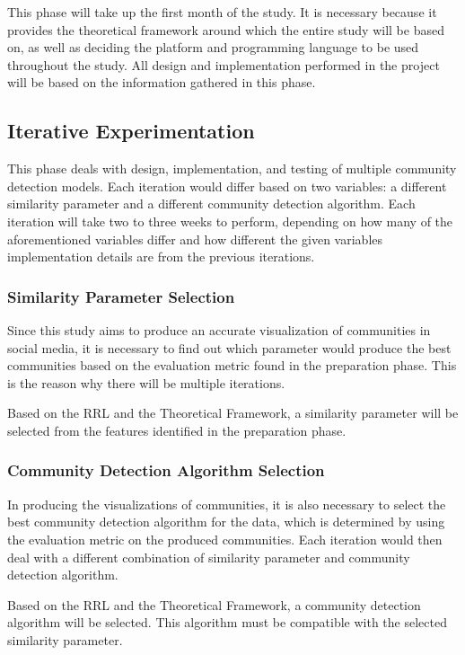 This phase will take up the first month of the study. It is necessary because it provides the theoretical framework around which the entire study will be based on, as well as deciding the platform and programming language to be used throughout the study. All design and implementation performed in the project will be based on the information gathered in this phase.

\subsection{Iterative Experimentation}

This phase deals with design, implementation, and testing of multiple community detection models. Each iteration would differ based on two variables: a different similarity parameter and a different community detection algorithm. Each iteration will take two to three weeks to perform, depending on how many of the aforementioned variables differ and how different the given variable\vtick s implementation details are from the previous iteration\vtick s.

\subsubsection{Similarity Parameter Selection}

Since this study aims to produce an accurate visualization of communities in social media, it is necessary to find out which parameter would produce the best communities based on the evaluation metric found in the preparation phase. This is the reason why there will be multiple iterations. 

Based on the RRL and the Theoretical Framework, a similarity parameter will be selected from the features identified in the preparation phase.

\subsubsection{Community Detection Algorithm Selection}

In producing the visualizations of communities, it is also necessary to select the best community detection algorithm for the data, which is determined by using the evaluation metric on the produced communities. Each iteration would then deal with a different combination of similarity parameter and community detection algorithm.

Based on the RRL and the Theoretical Framework, a community detection algorithm will be selected. This algorithm must be compatible with the selected similarity parameter.


